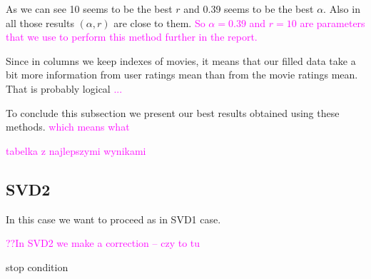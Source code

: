 \documentclass[11pt]{amsart}
\newcommand{\tami}[1]{{\textcolor{magenta}{#1}}}
\begin{document}
As we can see 10 seems to be the best $r$ and 0.39 seems to be the best $\alpha$.
Also in all those results $(\alpha, r)$ are close to them.
\tami{So $\alpha = 0.39$ and $r = 10$ are parameters that we use to perform this method further in the report.}

Since in columns we keep indexes of movies, it means that our filled data take a bit more information from user ratings mean than from the movie ratings mean.
That is probably logical \tami{...}

To conclude this subsection we present our best results obtained using these methods.
\tami{which means what}

\tami{tabelka z najlepszymi wynikami}


\subsection*{SVD2}
In this case we want to proceed as in SVD1 case.

\tami{??In SVD2 we make a correction -- czy to tu}

stop condition
\end{document}
